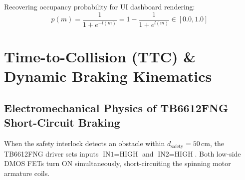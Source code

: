 \documentclass[11pt, a4paper]{article}
\begin{document}
Recovering occupancy probability for UI dashboard rendering:
\begin{equation}
    p(m) = \frac{1}{1 + e^{-l(m)}} = 1 - \frac{1}{1 + e^{l(m)}} \in [0.0, 1.0]
\end{equation}

\newpage
\section{Time-to-Collision (TTC) \& Dynamic Braking Kinematics}

\subsection{Electromechanical Physics of TB6612FNG Short-Circuit Braking}
When the safety interlock detects an obstacle within $d_{\text{safety}} = 50\,\text{cm}$, the TB6612FNG driver sets inputs $\text{IN1}=\text{HIGH}$ and $\text{IN2}=\text{HIGH}$. Both low-side DMOS FETs turn ON simultaneously, short-circuiting the spinning motor armature coils.
\end{document}
